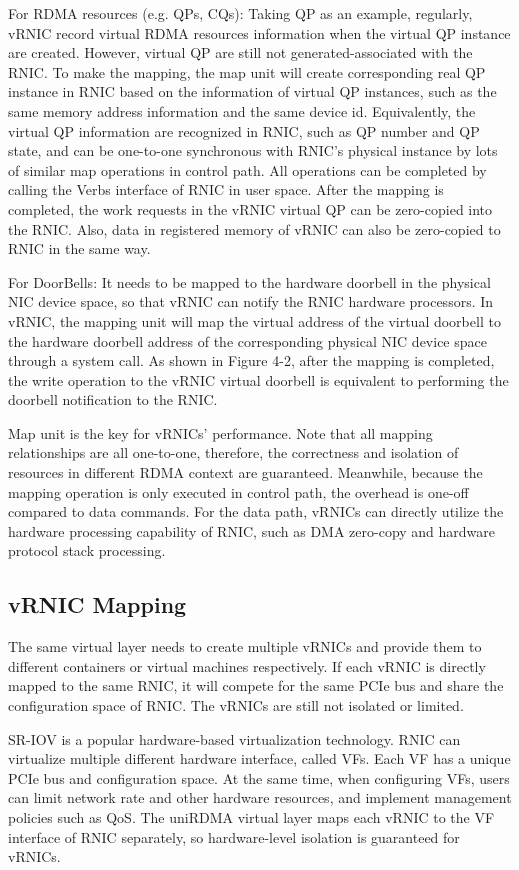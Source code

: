 For RDMA resources (e.g. QPs, CQs): Taking QP as an example, regularly, vRNIC record virtual RDMA resources information when the virtual QP instance are created. However, virtual QP are still not generated-associated with the RNIC. To make the mapping, the map unit will create corresponding real QP instance in RNIC based on the information of virtual QP instances, such as the same memory address information and the same device id. Equivalently, the virtual QP information are recognized in RNIC, such as QP number and QP state, and can be one-to-one synchronous with RNIC’s physical instance by lots of similar map operations in control path. All operations can be completed by calling the Verbs interface of RNIC in user space. After the mapping is completed, the work requests in the vRNIC virtual QP can be zero-copied into the RNIC. Also, data in registered memory of vRNIC can also be zero-copied to RNIC in the same way. 

For DoorBells: It needs to be mapped to the hardware doorbell in the physical NIC device space, so that vRNIC can notify the RNIC hardware processors. In vRNIC, the mapping unit will map the virtual address of the virtual doorbell to the hardware doorbell address of the corresponding physical NIC device space through a system call. As shown in Figure 4-2, after the mapping is completed, the write operation to the vRNIC virtual doorbell is equivalent to performing the doorbell notification to the RNIC.

Map unit is the key for vRNICs' performance. Note that all mapping relationships are all one-to-one, therefore, the correctness and isolation of resources in different RDMA context are guaranteed. Meanwhile, because the mapping operation is only executed in control path, the overhead is one-off compared to data commands. For the data path, vRNICs can directly utilize the hardware processing capability of RNIC, such as DMA zero-copy and hardware protocol stack processing.

\subsection{vRNIC Mapping}
The same virtual layer needs to create multiple vRNICs and provide them to different containers or virtual machines respectively. If each vRNIC is directly mapped to the same RNIC, it will compete for the same PCIe bus and share the configuration space of RNIC. The vRNICs are still not isolated or limited.

SR-IOV is a popular hardware-based virtualization technology. RNIC can virtualize multiple different hardware interface, called VFs. Each VF has a unique PCIe bus and configuration space. At the same time, when configuring VFs, users can limit network rate and other hardware resources, and implement management policies such as QoS. The uniRDMA virtual layer maps each vRNIC to the VF interface of RNIC separately, so hardware-level isolation is guaranteed for vRNICs.

